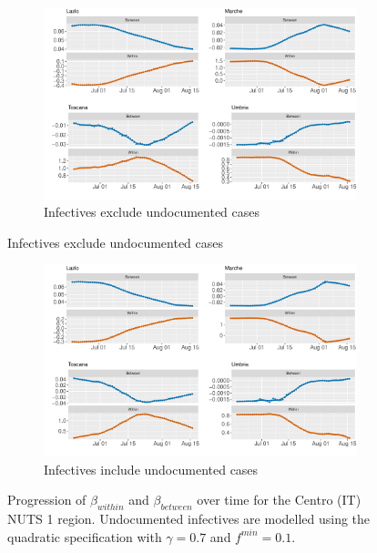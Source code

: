 \documentclass[12pt]{article}
\begin{document}
\begin{appendices}
		\begin{figure}[H]
    	    \centering
    	    \begin{subfigure}{\textwidth}
    	      \centering
    	      \includegraphics[width=0.94\linewidth]{output/model_between_lag14_betas_Centro (IT)_rolling.pdf}
    	      \caption{Infectives exclude undocumented cases}
    	      \label{fig:beta_between_over_time_centro_regular}
    	    \end{subfigure}
        \end{figure}
        \begin{figure}[H]\ContinuedFloat
    	    \begin{subfigure}{\textwidth}
    	      \centering
    	      \includegraphics[width=0.94\linewidth]{output/model_between_lag14_betas_Centro (IT)_UndocQuadratic_rolling.pdf}
    	      \caption{Infectives include undocumented cases}
    	      \label{fig:beta_between_over_time_centro_regular_undoc}
    	    \end{subfigure}
    	    \caption{Progression of $\beta_{within}$ and $\beta_{between}$ over time for the Centro (IT) NUTS 1 region. Undocumented infectives are modelled using the quadratic specification with $\gamma = 0.7$ and $f^{min}=0.1$.}
    	    \label{fig:beta_between_over_time_centro}
        \end{figure}
		

\end{appendices}
\end{document}
